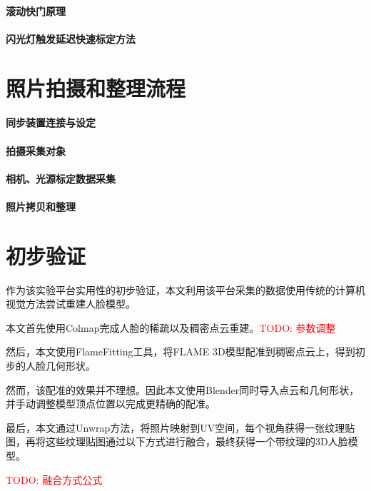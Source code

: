 \documentclass{scutmaster}
\newcommand{\TODO}[1]{\textcolor{red}{TODO: #1}}
\begin{document}
\paragraph{滚动快门原理}

\paragraph{闪光灯触发延迟快速标定方法}

\section{照片拍摄和整理流程}

\paragraph{同步装置连接与设定}

\paragraph{拍摄采集对象}

\paragraph{相机、光源标定数据采集}

\paragraph{照片拷贝和整理}

\section{初步验证}

作为该实验平台实用性的初步验证，本文利用该平台采集的数据使用传统的计算机视觉方法尝试重建人脸模型。

本文首先使用Colmap完成人脸的稀疏以及稠密点云重建。\TODO{参数调整}

然后，本文使用FlameFitting工具，将FLAME 3D模型配准到稠密点云上，得到初步的人脸几何形状。

然而，该配准的效果并不理想。因此本文使用Blender同时导入点云和几何形状，并手动调整模型顶点位置以完成更精确的配准。

最后，本文通过Unwrap方法，将照片映射到UV空间，每个视角获得一张纹理贴图，再将这些纹理贴图通过以下方式进行融合，最终获得一个带纹理的3D人脸模型。

\TODO{融合方式公式}
\end{document}
